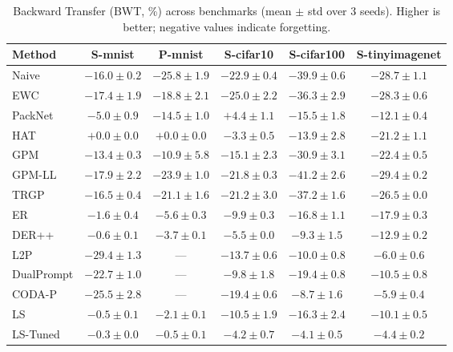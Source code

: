 \begin{table}[t]
\centering
\caption{Backward Transfer (BWT, \%) across benchmarks (mean $\pm$ std over 3 seeds). Higher is better; negative values indicate forgetting.}
\label{tab:bwt}
\small
\begin{tabular}{lccccc}
\toprule
Method & S-mnist & P-mnist & S-cifar10 & S-cifar100 & S-tinyimagenet \\
\midrule
Naive & $-16.0 \pm 0.2$ & $-25.8 \pm 1.9$ & $-22.9 \pm 0.4$ & $-39.9 \pm 0.6$ & $-28.7 \pm 1.1$ \\
EWC & $-17.4 \pm 1.9$ & $-18.8 \pm 2.1$ & $-25.0 \pm 2.2$ & $-36.3 \pm 2.9$ & $-28.3 \pm 0.6$ \\
PackNet & $-5.0 \pm 0.9$ & $-14.5 \pm 1.0$ & $\mathbf{+4.4} \pm 1.1$ & $-15.5 \pm 1.8$ & $-12.1 \pm 0.4$ \\
HAT & $\mathbf{+0.0} \pm 0.0$ & $\mathbf{+0.0} \pm 0.0$ & $-3.3 \pm 0.5$ & $-13.9 \pm 2.8$ & $-21.2 \pm 1.1$ \\
GPM & $-13.4 \pm 0.3$ & $-10.9 \pm 5.8$ & $-15.1 \pm 2.3$ & $-30.9 \pm 3.1$ & $-22.4 \pm 0.5$ \\
GPM-LL & $-17.9 \pm 2.2$ & $-23.9 \pm 1.0$ & $-21.8 \pm 0.3$ & $-41.2 \pm 2.6$ & $-29.4 \pm 0.2$ \\
TRGP & $-16.5 \pm 0.4$ & $-21.1 \pm 1.6$ & $-21.2 \pm 3.0$ & $-37.2 \pm 1.6$ & $-26.5 \pm 0.0$ \\
ER & $-1.6 \pm 0.4$ & $-5.6 \pm 0.3$ & $-9.9 \pm 0.3$ & $-16.8 \pm 1.1$ & $-17.9 \pm 0.3$ \\
DER++ & $-0.6 \pm 0.1$ & $-3.7 \pm 0.1$ & $-5.5 \pm 0.0$ & $-9.3 \pm 1.5$ & $-12.9 \pm 0.2$ \\
L2P & $-29.4 \pm 1.3$ & --- & $-13.7 \pm 0.6$ & $-10.0 \pm 0.8$ & $-6.0 \pm 0.6$ \\
DualPrompt & $-22.7 \pm 1.0$ & --- & $-9.8 \pm 1.8$ & $-19.4 \pm 0.8$ & $-10.5 \pm 0.8$ \\
CODA-P & $-25.5 \pm 2.8$ & --- & $-19.4 \pm 0.6$ & $-8.7 \pm 1.6$ & $-5.9 \pm 0.4$ \\
LS & $-0.5 \pm 0.1$ & $-2.1 \pm 0.1$ & $-10.5 \pm 1.9$ & $-16.3 \pm 2.4$ & $-10.1 \pm 0.5$ \\
LS-Tuned & $-0.3 \pm 0.0$ & $-0.5 \pm 0.1$ & $-4.2 \pm 0.7$ & $\mathbf{-4.1} \pm 0.5$ & $\mathbf{-4.4} \pm 0.2$ \\
\bottomrule
\end{tabular}
\end{table}